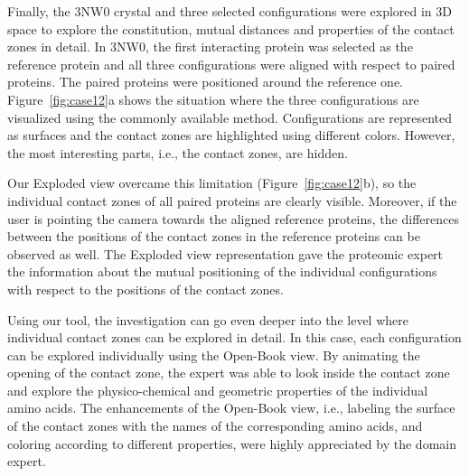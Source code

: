 \documentclass{bmcart}
\def\OpBook {Open-Book view\xspace}
\def\ExpView {Exploded view\xspace}
\begin{document}

Finally, the 3NW0 crystal and three selected configurations were explored in 3D space to explore the constitution, mutual distances and properties of the contact zones in detail.
In 3NW0, the first interacting protein was selected as the reference protein and all three configurations were aligned with respect to paired proteins.
The paired proteins were positioned around the reference one.
Figure~\ref{fig:case12}a shows the situation where the three configurations are visualized using the commonly available method.
Configurations are represented as surfaces and the contact zones are highlighted using different colors.
However, the most interesting parts, i.e., the contact zones, are hidden.

Our \ExpView overcame this limitation (Figure~\ref{fig:case12}b), so the individual contact zones of all paired proteins are clearly visible.
Moreover, if the user is pointing the camera towards the aligned reference proteins, the differences between the positions of the contact zones in the reference proteins can be observed as well.
The \ExpView representation gave the proteomic expert the information about the mutual positioning of the individual configurations with respect to the positions of the contact zones.

Using our tool, the investigation can go even deeper into the level where individual contact zones can be explored in detail.
In this case, each configuration can be explored individually using the \OpBook.
By animating the opening of the contact zone, the expert was able to look inside the contact zone and explore the physico-chemical and geometric properties of the individual amino acids.
The enhancements of the \OpBook, i.e., labeling the surface of the contact zones with the names of the corresponding amino acids, and coloring according to different properties, were highly appreciated by the domain expert.
\end{document}
